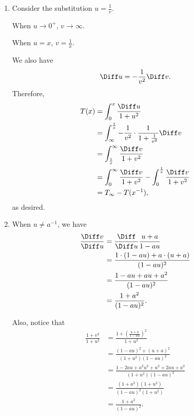 \Question{\currfilebase}

\begin{enumerate}
    \item Consider the substitution \(u = \frac{1}{v}\).

          When \(u \to 0^{+}\), \(v \to \infty\).

          When \(u = x\), \(v = \frac{1}{x}\).

          We also have
          \[
              \Diff u = - \frac{1}{v^2} \Diff v.
          \]
          Therefore,
          \begin{align*}
              T(x) & = \int_0^x \frac{\Diff u}{1 + u^2}                                                           \\
                   & = \int_{\infty}^{\frac{1}{x}} -\frac{1}{v^2} \cdot \frac{1}{1 + \frac{1}{v^2}} \Diff v       \\
                   & = \int_{\frac{1}{x}}^{\infty} \frac{\Diff v}{1 + v^2}                                        \\
                   & = \int_{0}^{\infty} \frac{\Diff v}{1 + v^2} - \int_{0}^{\frac{1}{x}} \frac{\Diff v}{1 + v^2} \\
                   & = T_{\infty} - T(x^{-1}),
          \end{align*}
          as desired.

    \item When \(u \neq a^{-1}\), we have
          \begin{align*}
              \frac{\Diff v}{\Diff u} & = \frac{\Diff}{\Diff u} \frac{u+a}{1-au}          \\
                                      & = \frac{1 \cdot (1-au) + a \cdot (u+a)}{(1-au)^2} \\
                                      & = \frac{1 - au + au + a^2}{(1-au)^2}              \\
                                      & = \frac{1 + a^2}{(1-au)^2}.
          \end{align*}

          Also, notice that
          \begin{align*}
              \frac{1 + v^2}{1 + u^2} & = \frac{1 + \left(\frac{u + a}{1 - au}\right)^2}{1 + u^2}     \\
                                      & = \frac{(1-au)^2 + (u+a)^2}{(1+u^2) (1-au)^2}                 \\
                                      & = \frac{1 - 2au + a^2u^2 + u^2 + 2au + a^2}{(1+u^2) (1-au)^2} \\
                                      & = \frac{(1 + a^2) (1 + u^2)}{(1 - au)^2 (1 + u^2)}            \\
                                      & = \frac{1 + a^2}{(1 - au)^2}.
          \end{align*}


\end{enumerate}
